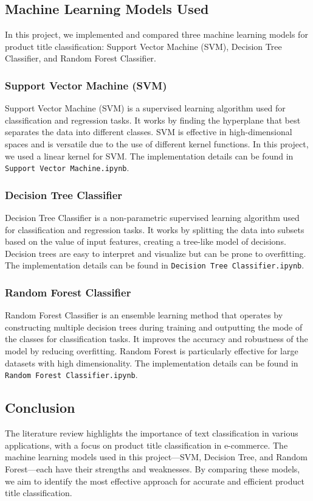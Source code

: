 \documentclass[10pt]{article}
\begin{document}
\subsection{Machine Learning Models Used}
In this project, we implemented and compared three machine learning models for product title classification: Support Vector Machine (SVM), Decision Tree Classifier, and Random Forest Classifier.

\subsubsection{Support Vector Machine (SVM)}
Support Vector Machine (SVM) is a supervised learning algorithm used for classification and regression tasks. It works by finding the hyperplane that best separates the data into different classes. SVM is effective in high-dimensional spaces and is versatile due to the use of different kernel functions. In this project, we used a linear kernel for SVM. The implementation details can be found in \texttt{Support Vector Machine.ipynb}.

\subsubsection{Decision Tree Classifier}
Decision Tree Classifier is a non-parametric supervised learning algorithm used for classification and regression tasks. It works by splitting the data into subsets based on the value of input features, creating a tree-like model of decisions. Decision trees are easy to interpret and visualize but can be prone to overfitting. The implementation details can be found in \texttt{Decision Tree Classifier.ipynb}.

\subsubsection{Random Forest Classifier}
Random Forest Classifier is an ensemble learning method that operates by constructing multiple decision trees during training and outputting the mode of the classes for classification tasks. It improves the accuracy and robustness of the model by reducing overfitting. Random Forest is particularly effective for large datasets with high dimensionality. The implementation details can be found in \texttt{Random Forest Classifier.ipynb}.

\subsection{Conclusion}
The literature review highlights the importance of text classification in various applications, with a focus on product title classification in e-commerce. The machine learning models used in this project—SVM, Decision Tree, and Random Forest—each have their strengths and weaknesses. By comparing these models, we aim to identify the most effective approach for accurate and efficient product title classification.
\end{document}
